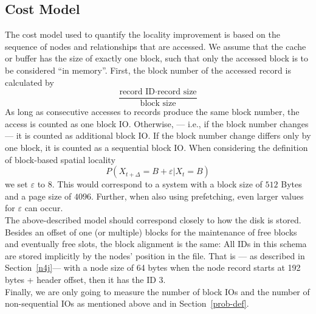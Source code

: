     \subsection*{Cost Model}
        The cost model used to quantify the locality improvement is based on the sequence of nodes and relationships that are accessed. 
        We assume that the cache or buffer has the size of exactly one block, such that only the accessed block is to be considered ``in memory''.
        First, the block number of the accessed record is calculated by 
        \[ \frac{\text{record ID} \cdot \text{record size}}{\text{block size}} \]
        As long as consecutive accesses to records produce the same block number, the access is counted as one block IO.
        Otherwise, --- i.e., if the block number changes --- it is counted as additional block IO. 
        If the block number change differs only by one block, it is counted as a sequential block IO.
        When considering the definition of block-based spatial locality
        \[ P(X_{t + \Delta} = B + \varepsilon | X_t = B) \]
        we set $\varepsilon$ to 8. 
        This would correspond to a system with a block size of $512$ Bytes and a page size of $4096$.
        Further, when also using prefetching, even larger values for $\varepsilon$ can occur.  \\
        The above-described model should correspond closely to how the disk is stored. 
        Besides an offset of one (or multiple) blocks for the maintenance of free blocks and eventually free slots, the block alignment is the same:
        All IDs in this schema are stored implicitly by the nodes' position in the file. 
        That is --- as described in Section~\ref{n4j}--- with a node size of 64 bytes when the node record starts at 192 bytes + header offset, then it has the ID $3$. \\
        Finally, we are only going to measure the number of block IOs and the number of non-sequential IOs as mentioned above and in Section~\ref{prob-def}.
    
